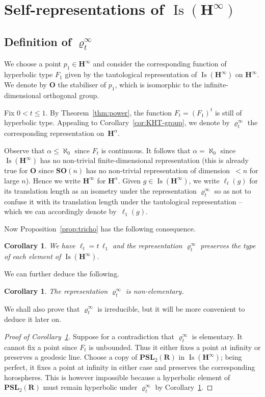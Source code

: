 \documentclass[11pt]{article}
\newtheorem{coro}[theo]{Corollary}
\theoremstyle{definition}
\numberwithin{equation}{section}
\numberwithin{figure}{section}
\numberwithin{table}{section}
\newcommand{\RR}{\mathbf{R}}
\newcommand{\PSL}{\mathbf{PSL}}
\newcommand{\HH}{\mathbf{H}}
\newcommand{\HHI}{\mathbf{H}^{\infty}}
\newcommand{\SO}{\mathbf{SO}}
\newcommand{\OO}{{\mathbf O}}
\newcommand{\Isomi}{{\Isom}(\HHI)}
\DeclareMathOperator{\Isom}{Is}
\newcommand{\ro}{\varrho}
\begin{document}
\section{Self-representations of \texorpdfstring{$\Isomi$}{Is(H)}}

\subsection{Definition of \texorpdfstring{$\ro^\infty_t$}{}}\label{defrot}

We choose a point $p_1\in\HHI$ and consider the corresponding function of hyperbolic type $F_1$ given by the tautological representation of $\Isom(\HHI)$ on $\HHI$. We denote by $\OO$ the stabiliser of $p_1$, which is isomorphic to the infinite-dimensional orthogonal group.

Fix $0<t\leq 1$. By Theorem~\ref{thm:power}, the function $F_t=(F_1)^t$ is still of hyperbolic type. Appealing to Corollary~\ref{cor:KHT-group}, we denote by $\ro^\infty_t$ the corresponding representation on~$\HH^\alpha$.

Observe that $\alpha\leq\aleph_0$ since $F_t$ is continuous. It follows that $\alpha=\aleph_0$ since $\Isom(\HHI)$ has no non-trivial finite-dimensional representation (this is already true for $\OO$ since $\SO(n)$ has no non-trivial representation of dimension~$<n$ for large $n$). Hence we write $\HHI$ for $\HH^\alpha$. Given $g\in\Isomi$, we write $\ell_t(g)$ for its translation length as an isometry under the representation $\ro^\infty_t$ so as not to confuse it with its translation length under the tautological representation -- which we can accordingly denote by~$\ell_1(g)$.

Now Proposition~\ref{prop:tricho} has the following consequence.

\begin{coro}\label{cor:type}
We have $\ell_t = t\, \ell_1$ and the representation $\ro^\infty_t$ preserves the type of each element of $\Isom(\HHI)$.
\end{coro}

We can further deduce the following.

\begin{coro}\label{cor:non-elem}
The representation $\ro^\infty_t$ is non-elementary.
\end{coro}

We shall also prove that $\ro^\infty_t$ is irreducible, but it will be more convenient to deduce it later on.

\begin{proof}[Proof of Corollary~\ref{cor:non-elem}]
Suppose for a contradiction that $\ro^\infty_t$ is elementary. It cannot fix a point since $F_t$ is unbounded. Thus it either fixes a point at infinity or preserves a geodesic line. Choose a copy of $\PSL_2(\RR)$ in $\Isomi$; being perfect, it fixes a point at infinity in either case and preserves the corresponding horospheres. This is however impossible because a hyperbolic element of $\PSL_2(\RR)$ must remain hyperbolic under $\ro^\infty_t$ by Corollary~\ref{cor:type}.
\end{proof}
\end{document}
